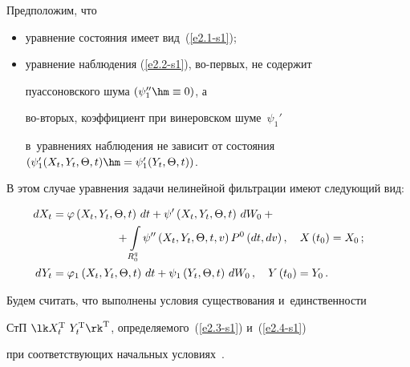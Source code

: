 Предположим, что

\begin{itemize}

\item уравнение состояния имеет вид~(\ref{e2.1-s1});



\item уравнение наблюдения (\ref{e2.2-s1}), во-пер\-вых, не содержит

пуассоновского шума $(\psi_1'' \hm\equiv 0)$, а

во-вто\-рых, коэффициент при винеровском шуме~$\psi_1'$  

в~уравнениях наблюдения не зависит от состояния $(\psi_1' (X_t, Y_t,\Theta, t)

\hm=\psi_1' (Y_t,\Theta, t))$.

\end{itemize}

В этом случае уравнения задачи нелинейной фильтрации имеют следующий вид:

\begin{align}

        \hspace*{-20mm}dX_t &=\varphi \left(X_t, Y_t,\Theta, t\right)\,dt+

    \psi'\left(X_t, Y_t,\Theta, t\right)\,dW_0+{}\notag\\

    &    \hspace*{20mm}{}+\int\limits_{R_0^q} \psi''\left(

    X_t, Y_t,\Theta, t,v\right) P^0 \,(dt, dv)\,,\quad  X\left(t_0\right) = X_0\,;\label{e2.3-s1}\\

        \hspace*{-20mm}dY_t &=\varphi_1 \left(X_t, Y_t,\Theta, t\right)\,dt +

    \psi_1 \left(Y_t,\Theta, t\right)\, dW_0\,,\quad Y\left(t_0\right) = Y_0\,.\label{e2.4-s1}

\end{align}





Будем считать, что выполнены условия существования и~единственности 

СтП  $\lk X_t^{\mathrm{T}}\ Y_t^{\mathrm{T}}\rk^{\mathrm{T}}$, определяемого~(\ref{e2.3-s1}) и~(\ref{e2.4-s1}) 

при соответствующих начальных условиях~\cite{7-s1, 6-s1, 5-s1}.



